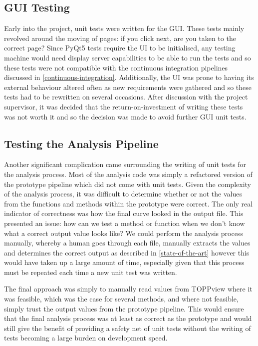 \documentclass{l4proj}
\begin{document}
\subsection{GUI Testing}
Early into the project, unit tests were written for the GUI. These tests mainly revolved around the moving of pages: if you click next, are you taken to the correct page? Since PyQt5 tests require the UI to be initialised, any testing machine would need display server capabilities to be able to run the tests and so these tests were not compatible with the continuous integration pipelines discussed in \ref{continuous-integration}. Additionally, the UI was prone to having its external behaviour altered often as new requirements were gathered and so these tests had to be rewritten on several occasions. After discussion with the project supervisor, it was decided that the return-on-investment of writing these tests was not worth it and so the decision was made to avoid further GUI unit tests.

\subsection{Testing the Analysis Pipeline}
Another significant complication came surrounding the writing of unit tests for the analysis process. Most of the analysis code was simply a refactored version of the prototype pipeline which did not come with unit tests. Given the complexity of the analysis process, it was difficult to determine whether or not the values from the functions and methods within the prototype were correct. The only real indicator of correctness was how the final curve looked in the output file. This presented an issue: how can we test a method or function when we don't know what a correct output value looks like? We could perform the analysis process manually, whereby a human goes through each file, manually extracts the values and determines the correct output as described in \ref{state-of-the-art} however this would have taken up a large amount of time, especially given that this process must be repeated each time a new unit test was written.

The final approach was simply to manually read values from TOPPview where it was feasible, which was the case for several methods, and where not feasible, simply trust the output values from the prototype pipeline. This would ensure that the final analysis process was at least as correct as the prototype and would still give the benefit of providing a safety net of unit tests without the writing of tests becoming a large burden on development speed.
\end{document}
